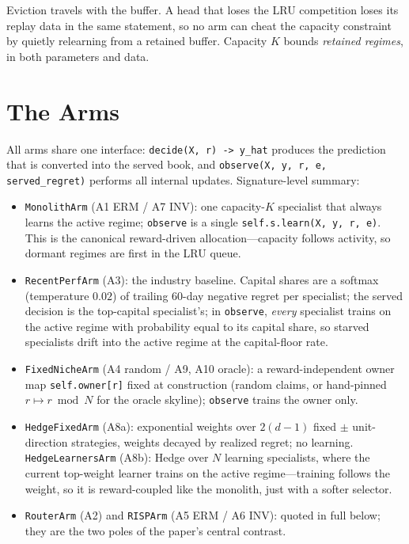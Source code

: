 \documentclass[11pt,a4paper]{article}
\theoremstyle{definition}
\theoremstyle{plain}
\begin{document}
\begin{keypoint}
Eviction travels with the buffer. A head that loses the LRU competition
loses its replay data in the same statement, so no arm can cheat the
capacity constraint by quietly relearning from a retained buffer. Capacity
$K$ bounds \emph{retained regimes}, in both parameters and data.
\end{keypoint}


\section{The Arms}
\label{sec:dd6-arms}

All arms share one interface: \texttt{decide(X, r) -> y\_hat} produces the
prediction that is converted into the served book, and
\texttt{observe(X, y, r, e, served\_regret)} performs all internal updates.
Signature-level summary:

\begin{itemize}
  \item \texttt{MonolithArm} (A1 ERM / A7 INV): one capacity-$K$ specialist
        that always learns the active regime; \texttt{observe} is a single
        \texttt{self.s.learn(X, y, r, e)}. This is the canonical
        reward-driven allocation---capacity follows activity, so dormant
        regimes are first in the LRU queue.
  \item \texttt{RecentPerfArm} (A3): the industry baseline. Capital shares
        are a softmax (temperature $0.02$) of trailing 60-day negative
        regret per specialist; the served decision is the top-capital
        specialist's; in \texttt{observe}, \emph{every} specialist trains on
        the active regime with probability equal to its capital share, so
        starved specialists drift into the active regime at the
        capital-floor rate.
  \item \texttt{FixedNicheArm} (A4 random / A9, A10 oracle): a
        reward-independent owner map \texttt{self.owner[r]} fixed at
        construction (random claims, or hand-pinned $r \mapsto r \bmod N$
        for the oracle skyline); \texttt{observe} trains the owner only.
  \item \texttt{HedgeFixedArm} (A8a): exponential weights over $2(d-1)$
        fixed $\pm$ unit-direction strategies, weights decayed by realized
        regret; no learning. \texttt{HedgeLearnersArm} (A8b): Hedge over $N$
        learning specialists, where the current top-weight learner trains on
        the active regime---training follows the weight, so it is
        reward-coupled like the monolith, just with a softer selector.
  \item \texttt{RouterArm} (A2) and \texttt{RISPArm} (A5 ERM / A6 INV):
        quoted in full below; they are the two poles of the paper's central
        contrast.
\end{itemize}
\end{document}
